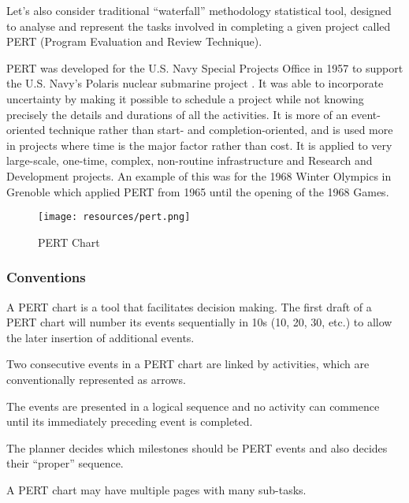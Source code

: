 
Let's also consider traditional ``waterfall'' methodology  statistical tool, designed to analyse and represent the tasks involved in completing a given project called PERT (Program Evaluation and Review Technique).

PERT was developed for the U.S. Navy Special Projects Office in 1957 to support the U.S. Navy's Polaris nuclear submarine project \cite{fazar}. It was able to incorporate uncertainty by making it possible to schedule a project while not knowing precisely the details and durations of all the activities. It is more of an event-oriented technique rather than start- and completion-oriented, and is used more in projects where time is the major factor rather than cost. It is applied to very large-scale, one-time, complex, non-routine infrastructure and Research and Development projects. An example of this was for the 1968 Winter Olympics in Grenoble which applied PERT from 1965 until the opening of the 1968 Games.


\begin{figure}
	\centering
	\texttt{[image: resources/pert.png]}
	\caption[PERT Chart]{PERT Chart}
\end{figure}

\subsubsection{Conventions}

\begin{compactitem}
\item A PERT chart is a tool that facilitates decision making. The first draft of a PERT chart will number its events sequentially in 10s (10, 20, 30, etc.) to allow the later insertion of additional events.
\item Two consecutive events in a PERT chart are linked by activities, which are conventionally represented as arrows.
\item The events are presented in a logical sequence and no activity can commence until its immediately preceding event is completed.
\item The planner decides which milestones should be PERT events and also decides their ``proper'' sequence.
\item A PERT chart may have multiple pages with many sub-tasks.
\end{compactitem}

